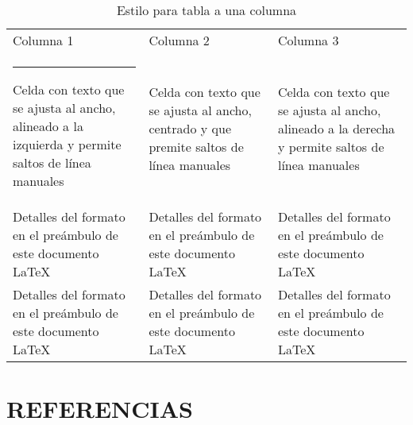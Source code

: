 \documentclass[10pt,twocolumn]{article}
\makeatletter
\newcommand{\thickhline}{%
    \noalign {\ifnum 0=`}\fi \hrule height 1.5pt
    \futurelet \reserved@a \@xhline
}
\makeatother
\begin{document}
\begin{table}
\small
\centering
\caption{Estilo para tabla a una columna}
\label{tabl:singlecolumn}
\begin{tabular}{| L{2.2cm} | C{2.2cm} | R{2.2cm} |}
\hline
Columna 1 &
Columna 2 &
Columna 3  \\  \thickhline
Celda con texto que se ajusta al ancho, alineado a la izquierda y permite \newline
   saltos de línea manuales &
Celda con texto que se ajusta al ancho, centrado y que premite \newline
    saltos de línea manuales &
Celda con texto que se ajusta al ancho, alineado a la derecha y permite \newline
   saltos de línea manuales \\  \hline
Detalles del formato  en el preámbulo de este documento \LaTeX  &
Detalles del formato  en el preámbulo de este documento \LaTeX &
Detalles del formato  en el preámbulo de este documento \LaTeX \\ \hline
Detalles del formato  en el preámbulo de este documento \LaTeX  &
Detalles del formato  en el preámbulo de este documento \LaTeX &
Detalles del formato  en el preámbulo de este documento \LaTeX \\ 
 \hline
\end{tabular}
\end{table}

\lipsum[4-8]

\section{REFERENCIAS
\vspace{-3ex}}  %


\renewcommand{\bibname}{}
%
 
\end{document}
